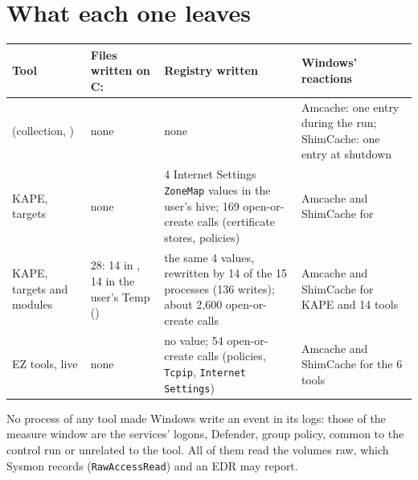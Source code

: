 \documentclass[11pt,a4paper,oneside]{report}
\begin{document}
\section{What each one leaves}

\begin{longtable}{@{}L{2.5cm}L{3.0cm}L{4.0cm}L{5.5cm}@{}}
\toprule
\textbf{Tool} & \textbf{Files written on C:} & \textbf{Registry written} &
  \textbf{Windows' reactions} \\
\midrule\endhead
\wac{} (collection, ) & none & none & Amcache: one entry during the
  run; ShimCache: one entry at shutdown \\
KAPE, targets & none & 4 Internet Settings \texttt{ZoneMap} values in the
  user's hive; 169 open-or-create calls (certificate stores, policies) &
  Amcache and ShimCache for  \\
KAPE, targets and modules & 28: 14 in
  , 14 in the user's Temp
  () & the same 4 values, rewritten
  by 14 of the 15 processes (136 writes); about 2,600 open-or-create calls &
  Amcache and ShimCache for KAPE and 14 tools \\
EZ tools, live & none & no value; 54 open-or-create calls (policies,
  \texttt{Tcpip}, \texttt{Internet Settings}) & Amcache and ShimCache for the
  6 tools \\
\bottomrule
\end{longtable}

No process of any tool made Windows write an event in its logs: those of the
measure window are the services' logons, Defender, group policy, common to the
control run or unrelated to the tool. All of them read the volumes raw, which
Sysmon records (\texttt{RawAccessRead}) and an EDR may report.
\end{document}
